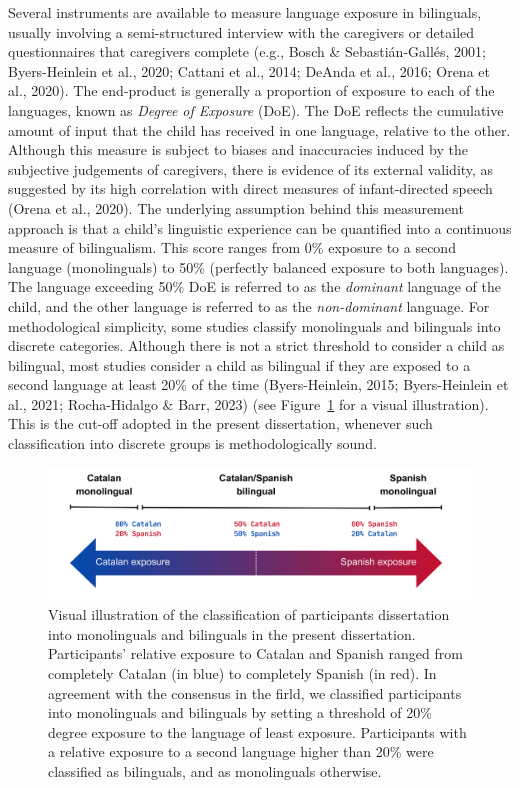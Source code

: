 \documentclass[
  12pt,
  b5paperpaper,
  twoside]{scrreprt}
\begin{document}
Several instruments are available to measure language exposure in
bilinguals, usually involving a semi-structured interview with the
caregivers or detailed questionnaires that caregivers complete (e.g.,
Bosch \& Sebastián-Gallés, 2001; Byers-Heinlein et al., 2020; Cattani et
al., 2014; DeAnda et al., 2016; Orena et al., 2020). The end-product is
generally a proportion of exposure to each of the languages, known as
\emph{Degree of Exposure} (DoE). The DoE reflects the cumulative amount
of input that the child has received in one language, relative to the
other. Although this measure is subject to biases and inaccuracies
induced by the subjective judgements of caregivers, there is evidence of
its external validity, as suggested by its high correlation with direct
measures of infant-directed speech (Orena et al., 2020). The underlying
assumption behind this measurement approach is that a child's linguistic
experience can be quantified into a continuous measure of bilingualism.
This score ranges from 0\% exposure to a second language (monolinguals)
to 50\% (perfectly balanced exposure to both languages). The language
exceeding 50\% DoE is referred to as the \emph{dominant} language of the
child, and the other language is referred to as the \emph{non-dominant}
language. For methodological simplicity, some studies classify
monolinguals and bilinguals into discrete categories. Although there is
not a strict threshold to consider a child as bilingual, most studies
consider a child as bilingual if they are exposed to a second language
at least 20\% of the time (Byers-Heinlein, 2015; Byers-Heinlein et al.,
2021; Rocha-Hidalgo \& Barr, 2023) (see Figure~\ref{fig-bilingualism}
for a visual illustration). This is the cut-off adopted in the present
dissertation, whenever such classification into discrete groups is
methodologically sound.

\begin{figure}

{\centering \includegraphics{chapters/../_assets/img/bilingualism.png}

}

\caption{\label{fig-bilingualism}Visual illustration of the
classification of participants dissertation into monolinguals and
bilinguals in the present dissertation. Participants' relative exposure
to Catalan and Spanish ranged from completely Catalan (in blue) to
completely Spanish (in red). In agreement with the consensus in the
firld, we classified participants into monolinguals and bilinguals by
setting a threshold of 20\% degree exposure to the language of least
exposure. Participants with a relative exposure to a second language
higher than 20\% were classified as bilinguals, and as monolinguals
otherwise.}

\end{figure}
\end{document}
